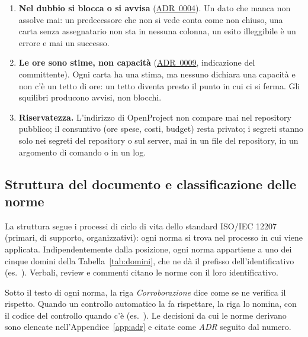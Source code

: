 \documentclass[a4paper, 11pt]{article}
\newcommand{\adr}[1]{\hyperref[adr:#1]{ADR~#1}}
\begin{document}
\begin{enumerate}
    \item \textbf{Nel dubbio si blocca o si avvisa} (\adr{0004}). Un dato che manca non assolve mai: un predecessore che non si vede conta come non chiuso, una carta senza assegnatario non sta in nessuna colonna, un esito illeggibile è un errore e mai un successo.
    \item \textbf{Le ore sono stime, non capacità} (\adr{0009}, indicazione del committente). Ogni carta ha una stima, ma nessuno dichiara una capacità e non c'è un tetto di ore: un tetto diventa presto il punto in cui ci si ferma. Gli squilibri producono avvisi, non blocchi.
    \item \textbf{Riservatezza.} L'indirizzo di OpenProject non compare mai nel repository pubblico; il consuntivo (ore spese, costi, budget) resta privato; i segreti stanno solo nei segreti del repository o sul server, mai in un file del repository, in un argomento di comando o in un log.
\end{enumerate}

\subsection{Struttura del documento e classificazione delle norme}
La struttura segue i processi di ciclo di vita dello standard ISO/IEC 12207 (primari, di supporto, organizzativi): ogni norma si trova nel processo in cui viene applicata. Indipendentemente dalla posizione, ogni norma appartiene a uno dei cinque domini della Tabella~\ref{tab:domini}, che ne dà il prefisso dell'identificativo (es.\ ). Verbali, review e commenti citano le norme con il loro identificativo.

Sotto il testo di ogni norma, la riga \emph{Corroborazione} dice come se ne verifica il rispetto. Quando un controllo automatico la fa rispettare, la riga lo nomina, con il codice del controllo quando c'è (es.\ ). Le decisioni da cui le norme derivano sono elencate nell'Appendice~\ref{app:adr} e citate come \emph{ADR} seguito dal numero.
\end{document}

